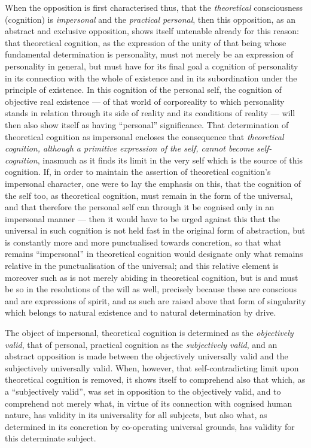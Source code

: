 \documentclass[12pt,a4paper]{book}
\begin{document}
When the opposition is first characterised thus, that the \emph{theoretical}
consciousness (cognition) is \emph{impersonal} and the \emph{practical
personal}, then this opposition, as an abstract and exclusive opposition,
shows itself untenable already for this reason: that theoretical cognition, as
the expression of the unity of that being whose fundamental determination is
personality, must not merely be an expression of personality in general, but
must have for its final goal a cognition of personality in its connection with
the whole of existence and in its subordination under the principle of
existence. In this cognition of the personal self, the cognition of objective
real existence --- of that world of corporeality to which personality stands
in relation through its side of reality and its conditions of reality --- will
then also show itself as having ``personal'' significance. That determination
of theoretical cognition as impersonal encloses the consequence that
\emph{theoretical cognition, although a primitive expression of the self,
cannot become self-cognition}, inasmuch as it finds its limit in the very self
which is the source of this cognition. If, in order to maintain the assertion
of theoretical cognition's impersonal character, one were to lay the emphasis
on this, that the cognition of the self too, as theoretical cognition, must
remain in the form of the universal, and that therefore the personal self can
through it be cognised only in an impersonal manner --- then it would have to
be urged against this that the universal in such cognition is not held fast in
the original form of abstraction, but is constantly more and more punctualised
towards concretion, so that what remains ``impersonal'' in theoretical
cognition would designate only what remains relative in the punctualisation of
the universal; and this relative element is moreover such
as is not merely abiding in theoretical cognition, but is and must be so in
the resolutions of the will as well, precisely because these are conscious and
are expressions of spirit, and as such are raised above that form of
singularity which belongs to natural existence and to natural determination by
drive.

The object of impersonal, theoretical cognition is determined as the
\emph{objectively valid}, that of personal, practical cognition as the
\emph{subjectively valid}, and an abstract opposition is made between the
objectively universally valid and the subjectively universally valid. When,
however, that self-contradicting limit upon theoretical cognition is removed,
it shows itself to comprehend also that which, as a ``subjectively valid'',
was set in opposition to the objectively valid, and to comprehend not merely
what, in virtue of its connection with cognised human nature, has validity in
its universality for all subjects, but also what, as determined in its
concretion by co-operating universal grounds, has validity for this determinate
subject.
\end{document}
